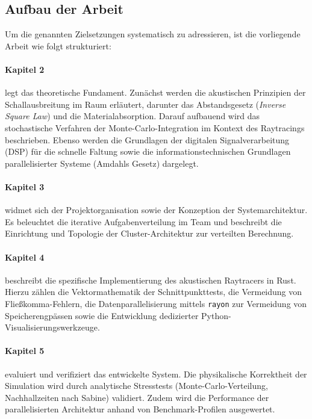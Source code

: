 \subsection{Aufbau der Arbeit}
\label{subsec:aufbau_der_arbeit}

Um die genannten Zielsetzungen systematisch zu adressieren, ist die vorliegende Arbeit wie folgt strukturiert:

\paragraph{Kapitel 2} legt das theoretische Fundament.
Zunächst werden die akustischen Prinzipien der Schallausbreitung im Raum erläutert, darunter das Abstandsgesetz (\textit{Inverse Square Law}) und die Materialabsorption.
Darauf aufbauend wird das stochastische Verfahren der Monte-Carlo-Integration im Kontext des Raytracings beschrieben.
Ebenso werden die Grundlagen der digitalen Signalverarbeitung (DSP) für die schnelle Faltung sowie die informationstechnischen Grundlagen parallelisierter Systeme (Amdahls Gesetz) dargelegt.

\paragraph{Kapitel 3} widmet sich der Projektorganisation sowie der Konzeption der Systemarchitektur.
Es beleuchtet die iterative Aufgabenverteilung im Team und beschreibt die Einrichtung und Topologie der Cluster-Architektur zur verteilten Berechnung.

\paragraph{Kapitel 4} beschreibt die spezifische Implementierung des akustischen Raytracers in Rust.
Hierzu zählen die Vektormathematik der Schnittpunkttests, die Vermeidung von Fließkomma-Fehlern, die Datenparallelisierung mittels \texttt{rayon} zur Vermeidung von Speicherengpässen sowie die Entwicklung dedizierter Python-Visualisierungswerkzeuge.

\paragraph{Kapitel 5} evaluiert und verifiziert das entwickelte System.
Die physikalische Korrektheit der Simulation wird durch analytische Stresstests (Monte-Carlo-Verteilung, Nachhallzeiten nach Sabine) validiert.
Zudem wird die Performance der parallelisierten Architektur anhand von Benchmark-Profilen ausgewertet.

